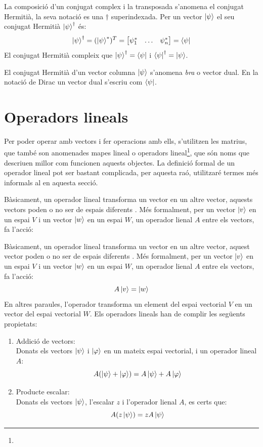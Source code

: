 La composició d'un conjugat complex i la transposada s'anomena el conjugat Hermitià, la seva notació es una $\dagger$ superindexada. Per un vector $\ket{\psi}$ el seu conjugat Hermitià $\ket{\psi}^\dagger$ és:
$$
\ket{\psi}^\dagger = (\ket{\psi}^*)^T =  \begin{bmatrix} \psi_{1}^* & \dots & \psi_{n}^* \end{bmatrix} = \bra{\psi}
$$
El conjugat Hermitià compleix que $\ket{\psi}^\dagger = \bra{\psi}$ i $\bra{\psi}^\dagger = \ket{\psi}$.

El conjugat Hermitià d'un vector columna $\ket{\psi}$ s'anomena \textit{bra} o vector dual. En la notació de Dirac un vector dual s'escriu com $\bra{\psi}$.

\section{Operadors lineals}
Per poder operar amb vectors i fer operacions amb ells, s'utilitzen les matrius, que també son anomenades mapes lineal o operadors lineal\footnote{}, que són noms que descriuen millor com funcionen aquests objectes. La definició formal de un operador lineal pot ser bastant complicada, per aquesta raó, utilitzaré termes més informals al en aquesta secció. 

Bàsicament, un operador lineal transforma un vector en un altre vector, aquests vectors poden o no ser de espais diferents \cite{LR_done_right:linear_map}. Més formalment, per un vector $\ket{v}$ en un espai $V$ i un vector $\ket{w}$ en un espai $W$, un operador lienal $A$ entre els vectors, fa l'acció:

Bàsicament, un operador lineal transforma un vector en un altre vector, aquest vector poden o no ser de espais diferents \cite{LR_done_right:linear_map}. Més formalment, per un vector $\ket{v}$ en un espai $V$ i un vector $\ket{w}$ en un espai $W$, un operador lienal $A$ entre els vectors, fa l'acció:
$$
A \ket{v} = \ket{w}
$$
En altres paraules, l'operador transforma un element del espai vectorial $V$ en un vector del espai vectorial $W$.
Els operadors lineals han de complir les següents propietats:
\begin{enumerate}
	\item Addició de vectors: \\
	Donats els vectors $\ket{\psi}$ i $\ket{\varphi}$ en un mateix espai vectorial, i un operador lineal $A$:
	$$ A(\ket{\psi} + \ket{\varphi}) = A\ket{\psi} + A\ket{\varphi}$$ 
	\item Producte escalar:\\
	Donats els vectors $\ket{\psi}$, l'escalar $z$ i l'operador lienal $A$, es certs que:
	$$ A(z\ket{\psi}) = z A \ket{\psi}$$
\end{enumerate}

